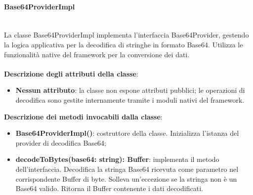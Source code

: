 \documentclass[a4paper,12pt]{article}
\begin{document}
{{{                \paragraph{Base64ProviderImpl}\label{par:Base64ProviderImpl}\mbox{}\\
                La classe Base64ProviderImpl implementa l'interfaccia Base64Provider, gestendo la logica applicativa per la decodifica di stringhe in formato Base64. Utilizza le funzionalità native del framework per la conversione dei dati.\\
                \\
                \textbf{Descrizione degli attributi della classe}:
                \begin{itemize}
                    \item \textbf{Nessun attributo}: la classe non espone attributi pubblici; le operazioni di decodifica sono gestite internamente tramite i moduli nativi del framework.
                \end{itemize}
                
                \noindent \textbf{Descrizione dei metodi invocabili dalla classe}:
                \begin{itemize}
                    \item \textbf{Base64ProviderImpl()}: costruttore della classe. Inizializza l'istanza del provider di decodifica Base64;
                    \item \textbf{decodeToBytes(base64: string): Buffer}: implementa il metodo dell'interfaccia. Decodifica la stringa Base64 ricevuta come parametro nel corrispondente Buffer di byte. Solleva un'eccezione se la stringa non è un Base64 valido. Ritorna il Buffer contenente i dati decodificati.
                \end{itemize}
}}}
\end{document}
